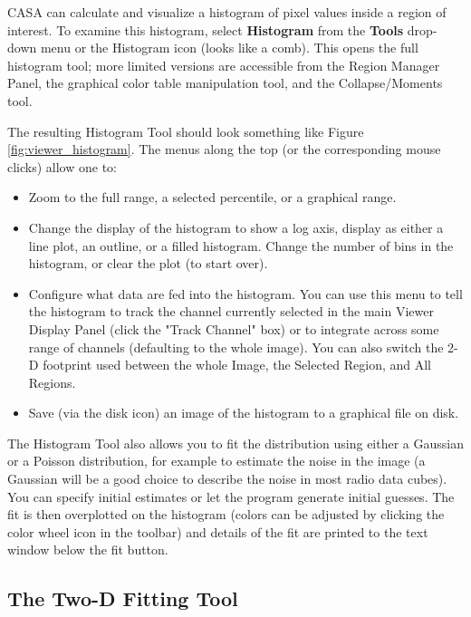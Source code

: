 CASA can calculate and visualize a histogram of pixel values inside a region of interest. To examine this histogram, select 
{\bf Histogram} from the {\bf Tools} drop-down menu or the Histogram icon (looks like a comb). This opens the full histogram
tool; more limited versions are accessible from the Region Manager Panel, the graphical color table manipulation tool,
and the Collapse/Moments tool. 

The resulting Histogram Tool should look something like Figure \ref{fig:viewer_histogram}. The menus along the top
(or the corresponding mouse clicks) allow one to:

\begin{itemize}
\item Zoom to the full range, a selected percentile, or a graphical range.
\item Change the display of the histogram to show a log axis, display as either a line plot, an outline, or a filled histogram. Change
the number of bins in the histogram, or clear the plot (to start over).
\item Configure what data are fed into the histogram. You can use this menu to tell the histogram to track the channel currently
selected in the main Viewer Display Panel (click the "Track Channel" box) or to integrate across some range of channels (defaulting
to the whole image). You can also switch the 2-D footprint used between the whole Image, the Selected Region, and All Regions.
\item Save (via the disk icon) an image of the histogram to a graphical file on disk.
\end{itemize}

The Histogram Tool also allows you to fit the distribution using either a Gaussian or a Poisson distribution, for example to estimate the
noise in the image (a Gaussian will be a good choice to describe the noise in most radio data cubes). You can specify initial 
estimates or let the program generate initial guesses. The fit is then overplotted on the histogram (colors can be adjusted by clicking
the color wheel icon in the toolbar) and details of the fit are printed to the text window below the fit button.


\subsection{The Two-D Fitting Tool}
\label{section:display.image.twodfit}

